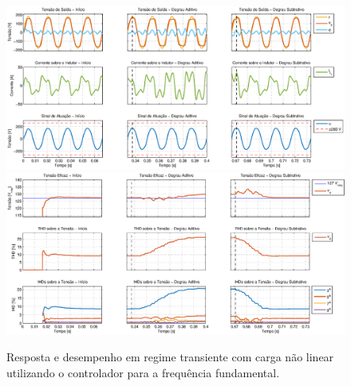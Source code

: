 \documentclass[repeatfields,oneside,overleaf]{tcc}
\begin{document}
\begin{figure}[h]
    \centering
    \caption{Resposta e desempenho em regime transiente com carga não linear utilizando o controlador para a frequência fundamental.}
    \includegraphics[trim={80 50 1 20}, clip, width=\linewidth]{fig/closed_1.eps}
    \\\vspace{0.475cm}
    \includegraphics[trim={80 20 1 20}, clip, width=\linewidth]{fig/harm_1.eps}
\end{figure}
\end{document}
